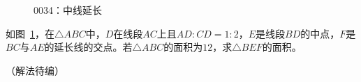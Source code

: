 

\begin{figure}[htbp]
  \centering
  \caption{0034：中线延长} \label{fig:0034}
\end{figure}

如图~\ref{fig:0034}，在$\triangle ABC$中，$D$在线段$AC$上且$AD:CD = 1:2$，$E$是线段$BD$的中点，$F$是$BC$与$AE$的延长线的交点。若$\triangle ABC$的面积为$12$，求$\triangle BEF$的面积。

（解法待编）
